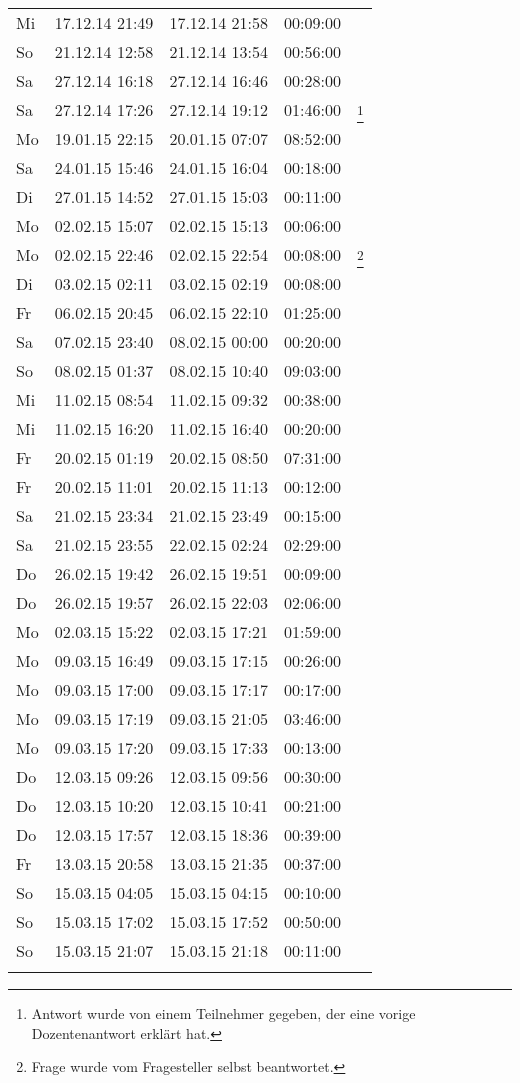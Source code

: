 \begin{longtable}{lrrrr}
Mi & 17.12.14 21:49 & 17.12.14 21:58 & 00:09:00 &  \\
So & 21.12.14 12:58 & 21.12.14 13:54 & 00:56:00 &  \\
Sa & 27.12.14 16:18 & 27.12.14 16:46 & 00:28:00 &  \\
Sa & 27.12.14 17:26 & 27.12.14 19:12 & 01:46:00 & \footnote{Antwort wurde von einem Teilnehmer gegeben, der eine vorige Dozentenantwort erklärt hat.} \\
Mo & 19.01.15 22:15 & 20.01.15 07:07 & 08:52:00 &  \\
Sa & 24.01.15 15:46 & 24.01.15 16:04 & 00:18:00 &  \\
Di & 27.01.15 14:52 & 27.01.15 15:03 & 00:11:00 &  \\
Mo & 02.02.15 15:07 & 02.02.15 15:13 & 00:06:00 &  \\
Mo & 02.02.15 22:46 & 02.02.15 22:54 & 00:08:00 & \footnote{Frage wurde vom Fragesteller selbst beantwortet.} \\
Di & 03.02.15 02:11 & 03.02.15 02:19 & 00:08:00 &  \\
Fr & 06.02.15 20:45 & 06.02.15 22:10 & 01:25:00 &  \\
Sa & 07.02.15 23:40 & 08.02.15 00:00 & 00:20:00 &  \\
So & 08.02.15 01:37 & 08.02.15 10:40 & 09:03:00 &  \\
Mi & 11.02.15 08:54 & 11.02.15 09:32 & 00:38:00 &  \\
Mi & 11.02.15 16:20 & 11.02.15 16:40 & 00:20:00 &  \\
Fr & 20.02.15 01:19 & 20.02.15 08:50 & 07:31:00 &  \\
Fr & 20.02.15 11:01 & 20.02.15 11:13 & 00:12:00 &  \\
Sa & 21.02.15 23:34 & 21.02.15 23:49 & 00:15:00 &  \\
Sa & 21.02.15 23:55 & 22.02.15 02:24 & 02:29:00 &  \\
Do & 26.02.15 19:42 & 26.02.15 19:51 & 00:09:00 &  \\
Do & 26.02.15 19:57 & 26.02.15 22:03 & 02:06:00 &  \\
Mo & 02.03.15 15:22 & 02.03.15 17:21 & 01:59:00 &  \\
Mo & 09.03.15 16:49 & 09.03.15 17:15 & 00:26:00 &  \\
Mo & 09.03.15 17:00 & 09.03.15 17:17 & 00:17:00 &  \\
Mo & 09.03.15 17:19 & 09.03.15 21:05 & 03:46:00 &  \\
Mo & 09.03.15 17:20 & 09.03.15 17:33 & 00:13:00 &  \\
Do & 12.03.15 09:26 & 12.03.15 09:56 & 00:30:00 &  \\
Do & 12.03.15 10:20 & 12.03.15 10:41 & 00:21:00 &  \\
Do & 12.03.15 17:57 & 12.03.15 18:36 & 00:39:00 &  \\
Fr & 13.03.15 20:58 & 13.03.15 21:35 & 00:37:00 &  \\
So & 15.03.15 04:05 & 15.03.15 04:15 & 00:10:00 &  \\
So & 15.03.15 17:02 & 15.03.15 17:52 & 00:50:00 &  \\
So & 15.03.15 21:07 & 15.03.15 21:18 & 00:11:00 &  \\
\label{tab:erp4students}
\end{longtable}


